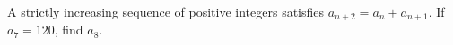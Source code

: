 A strictly increasing sequence of positive integers satisfies $a_{n+2}=a_n+a_{n+1}$. If $a_7=120$, find $a_8$.
